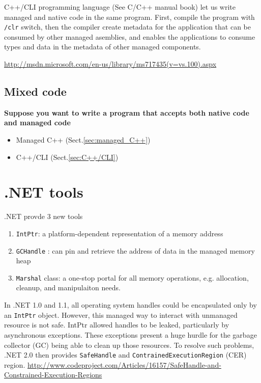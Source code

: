 C++/CLI programming language (See C/C++ manual book) let us write managed and
native code in the same program. First, compile the program with \verb!/clr!
switch, then the compiler create metadata for the application that can be
consumed by other managed asemblies, and enables the applications to consume
types and data in the metadata of other managed components.

\url{http://msdn.microsoft.com/en-us/library/ms717435(v=vs.100).aspx}


\subsection{Mixed code}

{\bf Suppose you want to write a program that accepts both native code and managed code}
\begin{itemize}	
  \item Managed C++ (Sect.\ref{sec:managed_C++}) 
  \item C++/CLI (Sect.\ref{sec:C++/CLI})
\end{itemize}


\section{.NET tools}
\label{sec:NET_tools}

.NET provde 3 new tools
\begin{enumerate}
  \item \verb!IntPtr!: a platform-dependent representation of a memory address
  \item \verb!GCHandle! :  can pin and retrieve the address of data in the
  managed memory heap
  \item \verb!Marshal! class: a one-stop portal for all memory operations, e.g.
  allocation, cleanup, and manipulaiton needs.
\end{enumerate}

In .NET 1.0 and 1.1, all operating system handles could be encapsulated only by
an \verb!IntPtr! object. However, this managed way to interact with unmanaged
resource is not safe.  IntPtr allowed handles to be leaked, particularly by
asynchronous exceptions. These exceptions present a huge hurdle for the garbage
collector (GC) being able to clean up those resources.  
To resolve such problems, .NET 2.0 then provides \verb!SafeHandle! and
\verb!ContrainedExecutionRegion! (CER) region. 
\url{http://www.codeproject.com/Articles/16157/SafeHandle-and-Constrained-Execution-Regions}



